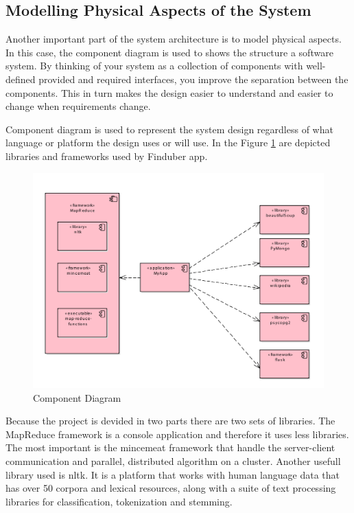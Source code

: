 \subsection{Modelling Physical Aspects of the System}

Another important part of the system architecture is to model physical aspects. In this case, the component diagram is used to shows the structure a software system. By thinking of your system as a collection of components with well-defined provided and required interfaces, you improve the separation between the components. This in turn makes the design easier to understand and easier to change when requirements change.

Component diagram is used to represent the system design regardless of what language or platform the design uses or will use. In the Figure \ref{component_uml} are depicted libraries and frameworks used by Finduber app.
 
\begin{figure}[!ht]
\centering
\includegraphics[width=15cm]{Component}
\caption{Component Diagram}\label{component_uml}
\end{figure}

Because the project is devided in two parts there are two sets of libraries. The MapReduce framework is a console application and therefore it uses less libraries. The most important is the mincemeat framework that handle the server-client communication and parallel, distributed algorithm on a cluster. Another usefull library used is nltk. It is a platform that works with human language data that has over 50 corpora and lexical resources, along with a suite of text processing libraries for classification, tokenization and stemming. 

